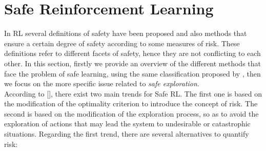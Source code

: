 \section{Safe Reinforcement Learning}\label{sec:saferl}
In \ac{RL} several definitions of safety have been proposed and also methods that ensure a certain degree of safety according to some measures of risk. These definitions refer to different facets of safety, hence they are not conflicting to each other. In this section, firstly we provide an overview of the different methods that face the problem of safe learning, using the same classification proposed by \citeauthor{garcia2015}, then we focus on the more specific issue related to \emph{safe exploration}.\\
\newline
According to [\cite{garcia2015}], there exist two main trends for Safe \ac{RL}. The first one is based on the modification of the optimality criterion to introduce the concept of risk. The second is based on the modification of the exploration process, so as to avoid the exploration of actions that may lead the system to undesirable or catastrophic situations. Regarding the first trend, there are several alternatives to quantify risk:
